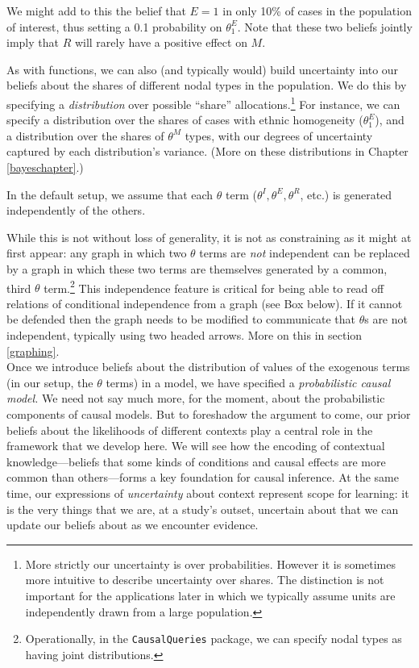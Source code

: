 \documentclass[
  12pt,
]{book}
\begin{document}
We might add to this the belief that \(E=1\) in only 10\% of cases in the population of interest, thus setting a 0.1 probability on \(\theta^E_1\). Note that these two beliefs jointly imply that \(R\) will rarely have a positive effect on \(M\).

As with functions, we can also (and typically would) build uncertainty into our beliefs about the shares of different nodal types in the population. We do this by specifying a \emph{distribution} over possible ``share'' allocations.\footnote{More strictly our uncertainty is over probabilities. However it is sometimes more intuitive to describe uncertainty over shares. The distinction is not important for the applications later in which we typically assume units are independently drawn from a large population.} For instance, we can specify a distribution over the shares of cases with ethnic homogeneity (\(\theta^E_1\)), and a distribution over the shares of \(\theta^M\) types, with our degrees of uncertainty captured by each distribution's variance. (More on these distributions in Chapter \ref{bayeschapter}.)

In the default setup, we assume that each \(\theta\) term (\(\theta^I, \theta^E, \theta^R\), etc.) is generated independently of the others.

While this is not without loss of generality, it is not as constraining as it might at first appear: any graph in which two \(\theta\) terms are \emph{not} independent can be replaced by a graph in which these two terms are themselves generated by a common, third \(\theta\) term.\footnote{Operationally, in the \texttt{CausalQueries} package, we can specify nodal types as having joint distributions.} This independence feature is critical for being able to read off relations of conditional independence from a graph (see Box below). If it cannot be defended then the graph needs to be modified to communicate that \(\theta\)s are not independent, typically using two headed arrows. More on this in section \ref{graphing}.\\

Once we introduce beliefs about the distribution of values of the exogenous terms (in our setup, the \(\theta\) terms) in a model, we have specified a \emph{probabilistic causal model.} We need not say much more, for the moment, about the probabilistic components of causal models. But to foreshadow the argument to come, our prior beliefs about the likelihoods of different contexts play a central role in the framework that we develop here. We will see how the encoding of contextual knowledge---beliefs that some kinds of conditions and causal effects are more common than others---forms a key foundation for causal inference. At the same time, our expressions of \emph{uncertainty} about context represent scope for learning: it is the very things that we are, at a study's outset, uncertain about that we can update our beliefs about as we encounter evidence.
\end{document}
